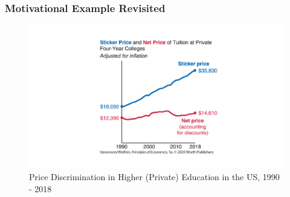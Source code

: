 \documentclass[10pt]{beamer}
\begin{document}
\begin{frame}
\end{frame}

\begin{frame} 
	\frametitle{Motivational Example Revisited}
	
	
	\begin{figure}[H]
		\centering
		\includegraphics[width=1.0\linewidth]{college_pd}
		\caption{Price Discrimination in Higher (Private) Education in the US, 1990 - 2018 \\ 
			\label{fig:nopd}}
	\end{figure}
	

\end{frame}
\end{document}
